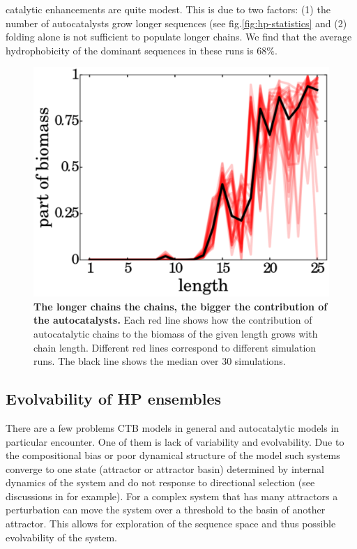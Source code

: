 \documentclass[twocolumn,letterpaper]{revtex4-1}
\begin{document}
catalytic enhancements are quite modest.  This is due to two factors: (1) the number of 
autocatalysts grow longer sequences (see fig.\ref{fig:hp-statistics} and (2) folding alone is not 
sufficient to populate longer chains.  We find that the average hydrophobicity of the dominant 
sequences in these runs is $68\%$.
 \begin{figure}[ht!]
  \centering
  \includegraphics[width=0.9\columnwidth]{pictures/biomass.eps} 
  \caption{\footnotesize{\textbf{The longer chains the chains, the bigger the contribution of the 
autocatalysts.} Each red line shows how the contribution of autocatalytic chains to the biomass 
of the given length grows with chain length. Different red lines correspond to different 
simulation runs.  The black line shows the median over 30 simulations.
}}
  \label{fig:biomass}
\end{figure}

\subsection*{Evolvability of HP ensembles}
There are a few problems CTB models in general and autocatalytic models in particular encounter. 
One of them is lack of variability and evolvability. Due to the compositional bias or poor 
dynamical structure of 
the model such systems converge to one state (attractor or attractor basin) determined by 
internal dynamics of the system and do not response to directional 
selection (see discussions in \cite{Derr2012,Vasas2015} for example). For a complex system that 
has many attractors a  perturbation can move the system over a threshold to the basin of another 
attractor. This allows for exploration of the sequence space and thus possible evolvability of the 
system. 
\end{document}
